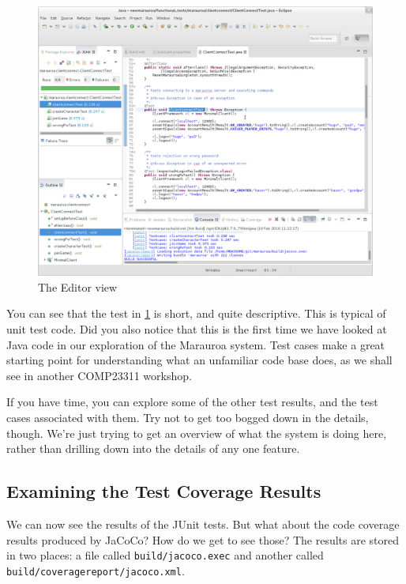 \documentclass[
]{book}
\begin{document}
\begin{figure}

{\centering \includegraphics[width=1\linewidth]{images/3.3.4showSourceOfTestFromTestReport} 

}

\caption{The Editor view}\label{fig:showSourceOfTestFromTestReport-fig}
\end{figure}

You can see that the test in \ref{fig:showSourceOfTestFromTestReport-fig} is short, and quite descriptive. This is typical of unit test code. Did you also notice that this is the first time we have looked at Java code in our exploration of the Marauroa system. Test cases make a great starting point for understanding what an unfamiliar code base does, as we shall see in another COMP23311 workshop.

If you have time, you can explore some of the other test results, and the test cases associated with them. Try not to get too bogged down in the details, though. We're just trying to get an overview of what the system is doing here, rather than drilling down into the details of any one feature.

\hypertarget{examining-the-test-coverage-results}{%
\subsection{Examining the Test Coverage Results}\label{examining-the-test-coverage-results}}

We can now see the results of the JUnit tests. But what about the code coverage results produced by JaCoCo? How do we get to see those? The results are stored in two places: a file called \texttt{build/jacoco.exec} and another called \texttt{build/coveragereport/jacoco.xml}.
\end{document}
